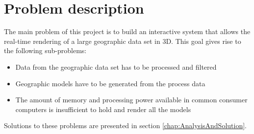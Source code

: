 \chapter{Problem description}
\label{chapter:ProblemDescription}
The main problem of this project is to build an interactive system that allows the real-time rendering of a large geographic data set in 3D. This goal gives rise to the following sub-problems:
\begin{itemize}
   \item Data from the geographic data set has to be processed and filtered
   \item Geographic models have to be generated from the process data
   \item The amount of memory and processing power available in common consumer computers is insufficient to hold and render all the models
\end{itemize}
Solutions to these problems are presented in section \ref{chap:AnalysisAndSolution}. 